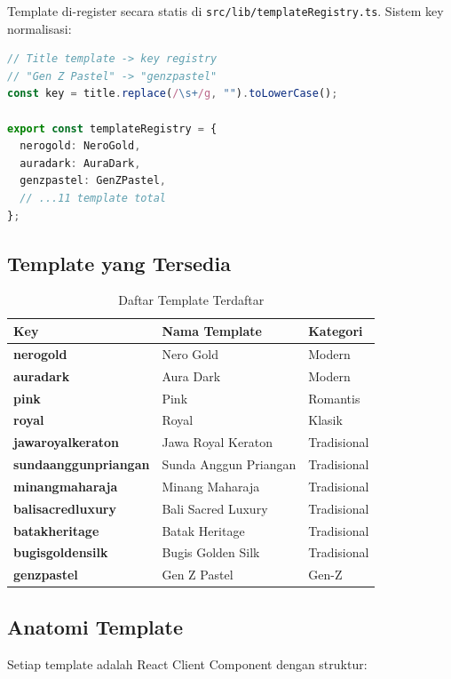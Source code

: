 \documentclass[12pt,a4paper]{article}
\begin{document}
Template di-register secara statis di \texttt{src/lib/templateRegistry.ts}.
Sistem key normalisasi:

\begin{lstlisting}[language=typescript, caption=Key Normalization]
// Title template -> key registry
// "Gen Z Pastel" -> "genzpastel"
const key = title.replace(/\s+/g, "").toLowerCase();

export const templateRegistry = {
  nerogold: NeroGold,
  auradark: AuraDark,
  genzpastel: GenZPastel,
  // ...11 template total
};
\end{lstlisting}

\subsection{Template yang Tersedia}

\begin{table}[h]
\centering
\begin{tabular}{>{\bfseries}l l l}
\toprule
Key & Nama Template & Kategori \\
\midrule
nerogold          & Nero Gold            & Modern \\
auradark          & Aura Dark            & Modern \\
pink              & Pink                 & Romantis \\
royal             & Royal                & Klasik \\
jawaroyalkeraton  & Jawa Royal Keraton   & Tradisional \\
sundaanggunpriangan & Sunda Anggun Priangan & Tradisional \\
minangmaharaja    & Minang Maharaja      & Tradisional \\
balisacredluxury  & Bali Sacred Luxury   & Tradisional \\
batakheritage     & Batak Heritage       & Tradisional \\
bugisgoldensilk   & Bugis Golden Silk    & Tradisional \\
genzpastel        & Gen Z Pastel         & Gen-Z \\
\bottomrule
\end{tabular}
\caption{Daftar Template Terdaftar}
\end{table}

\subsection{Anatomi Template}

Setiap template adalah React Client Component dengan struktur:
\end{document}
